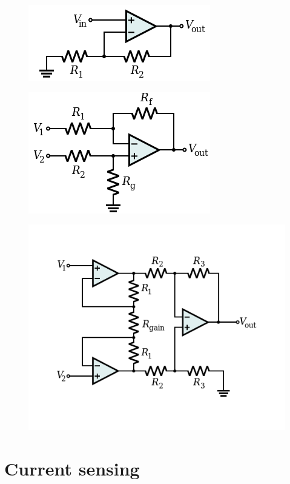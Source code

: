 \begin{figure}[!h]
    \centering
    \begin{minipage}{.325\textwidth}
      \centering
      \includegraphics[width=.8\linewidth]{Figures/Op-Amp_Non-Inverting_Amplifier}
      \label{fig:opamp-non-inverting}
    \end{minipage}
    \begin{minipage}{.325\textwidth}
      \centering
      \includegraphics[width=.8\linewidth]{Figures/Op-Amp_Differential_Amplifier}
      \label{fig:opamp-differential}
    \end{minipage}
    \begin{minipage}{.325\textwidth}
        \centering
        \includegraphics[width=0.9\linewidth]{Figures/Op-Amp_Instrumentation_Amplifier}
        \label{fig:opamp-instrumentation}
      \end{minipage}    
    \end{figure}

\pagebreak
\section{Current sensing}\label{sec:cursens}

